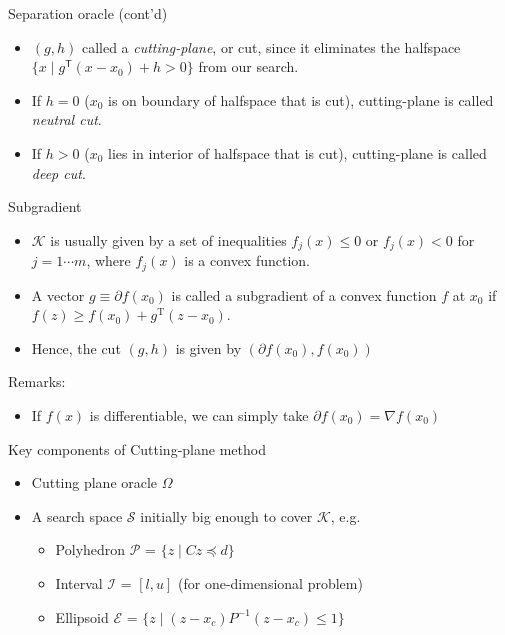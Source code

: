 \documentclass[10pt,ignorenonframetext,serif,onlymath]{beamer}
\providecommand{\tightlist}{%
  \setlength{\itemsep}{0pt}\setlength{\parskip}{0pt}}
\begin{document}
\begin{frame}{Separation oracle (cont’d)}
\protect\hypertarget{separation-oracle-contd}{}

\begin{itemize}
\item
  \((g, h)\) called a \emph{cutting-plane}, or cut, since it eliminates
  the halfspace \(\{x \mid g^\mathsf{T} (x - x_0) + h > 0\}\) from our search.
\item
  If \(h=0\) (\(x_0\) is on boundary of halfspace that is cut),
  cutting-plane is called \emph{neutral cut}.
\item
  If \(h>0\) (\(x_0\) lies in interior of halfspace that is cut),
  cutting-plane is called \emph{deep cut}.
\end{itemize}

\end{frame}

\begin{frame}{Subgradient}
\protect\hypertarget{subgradient}{}

\begin{itemize}
\tightlist
\item
  \(\mathcal{K}\) is usually given by a set of inequalities
  \(f_j(x) \le 0\) or \(f_j(x) < 0\) for \(j = 1 \cdots m\), where
  \(f_j(x)\) is a convex function.
\item
  A vector \(g \equiv \partial f(x_0)\) is called a subgradient of a
  convex function \(f\) at \(x_0\) if
  \(f(z) \geq f(x_0) + g^\mathrm{T} (z - x_0)\).
\item
  Hence, the cut \((g, h)\) is given by \((\partial f(x_0), f(x_0))\)
\end{itemize}

Remarks:

\begin{itemize}
\tightlist
\item
  If \(f(x)\) is differentiable, we can simply take
  \(\partial f(x_0) = \nabla f(x_0)\)
\end{itemize}

\end{frame}

\begin{frame}{Key components of Cutting-plane method}
\protect\hypertarget{key-components-of-cutting-plane-method}{}

\begin{itemize}
\tightlist
\item
  Cutting plane oracle \(\Omega\)
\item
  A search space \(\mathcal{S}\) initially big enough to cover
  \(\mathcal{K}\), e.g.

  \begin{itemize}
  \tightlist
  \item
    Polyhedron \(\mathcal{P}\) = \(\{z \mid C z \preceq d \}\)
  \item
    Interval \(\mathcal{I}\) = \([l, u]\) (for one-dimensional problem)
  \item
    Ellipsoid \(\mathcal{E}\) =
    \(\{z \mid (z-x_c)P^{-1}(z-x_c) \leq 1 \}\)
  \end{itemize}
\end{itemize}

\end{frame}
\end{document}
